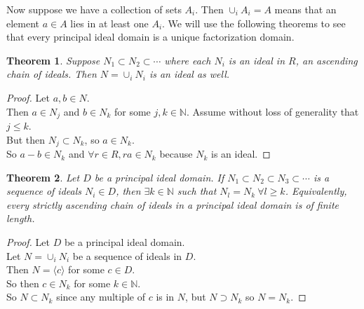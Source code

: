 \documentclass[11pt]{amsart}
\newtheorem{theorem}{Theorem}[section]
\theoremstyle{definition}
\newcommand{\naturals}{\mathbb{N}}
\begin{document}
Now suppose we have a collection of sets $A_i$. Then $\cup_i A_i = A$ means that an element $a \in A$ lies in at least one $A_i$. We will use
the following theorems to see that every principal ideal domain is a unique factorization domain.
\begin{theorem}
	Suppose $N_1 \subset N_2 \subset \cdots$ where each $N_i$ is an ideal in $R$, an ascending chain of ideals. Then 
	$N = \cup_i N_i$ is an ideal as well.
\end{theorem}
\begin{proof}
	Let $a, b \in N$. \\
	Then $a \in N_j$ and $b \in N_k$ for some $j, k \in \naturals$. Assume without loss of generality that $j \leq k$. \\
	But then $N_j \subset N_k$, so $a \in N_k$. \\
	So $a - b \in N_k$ and $\forall r \in R, ra \in N_k$ because $N_k$ is an ideal.
\end{proof}
\begin{theorem}
	Let $D$ be a principal ideal domain. If $N_1 \subset N_2 \subset N_3 \subset \cdots$ is a sequence of ideals $N_i \in D$, then
	$\exists k \in \naturals$ such that $N_l = N_k \: \forall l \geq k$. Equivalently, every strictly ascending chain of ideals in a principal
	ideal domain is of finite length.
\end{theorem}
\begin{proof}
	Let $D$ be a principal ideal domain. \\
	Let $N = \cup_i N_i$ be a sequence of ideals in $D$. \\
	Then $N = \langle c \rangle$ for some $c \in D$. \\
	So then $c \in N_k$ for some $k \in \naturals$. \\
	So $N \subset N_k$ since any multiple of $c$ is in $N$, but $N \supset N_k$ so $N = N_k$.
\end{proof}
\end{document}
